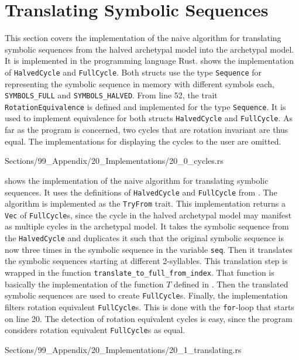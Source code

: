 \section{Translating Symbolic Sequences}

This section covers the implementation of the naive algorithm for translating symbolic sequences from the halved archetypal model into the archetypal model.
It is implemented in the programming language Rust.
 shows the implementation of \texttt{HalvedCycle} and \texttt{FullCycle}.
Both structs use the type \texttt{Sequence} for representing the symbolic sequence in memory with different symbols each, \texttt{SYMBOLS\_FULL} and \texttt{SYMBOLS\_HALVED}.
From line 52, the trait \texttt{RotationEquivalence} is defined and implemented for the type \texttt{Sequence}.
It is used to implement equivalence for both structs \texttt{HalvedCycle} and \texttt{FullCycle}.
As far as the program is concerned, two cycles that are rotation invariant are thus equal.
The implementations for displaying the cycles to the user are omitted.


{Sections/99_Appendix/20_Implementations/20_0_cycles.rs}

\clearpage
{} shows the implementation of the naive algorithm for translating symbolic sequences.
It uses the definitions of \texttt{HalvedCycle} and \texttt{FullCycle} from .
The algorithm is implemented as the \texttt{TryFrom} trait.
This implementation returns a \texttt{Vec} of \texttt{FullCycle}s, since the cycle in the halved archetypal model may manifest as multiple cycles in the archetypal model.
It takes the symbolic sequence from the \texttt{HalvedCycle} and duplicates it such that the original symbolic sequence is now three times in the symbolic sequence in the variable \texttt{seq}.
Then it translates the symbolic sequences starting at different 2-syllables.
This translation step is wrapped in the function \texttt{translate\_to\_full\_from\_index}.
That function is basically the implementation of the function $T$ defined in .
Then the translated symbolic sequences are used to create \texttt{FullCycle}s.
Finally, the implementation filters rotation equivalent \texttt{FullCycle}s.
This is done with the \texttt{for}-loop that starts on line 20.
The detection of rotation equivalent cycles is easy, since the program considers rotation equivalent \texttt{FullCycle}s as equal.



{Sections/99_Appendix/20_Implementations/20_1_translating.rs}
